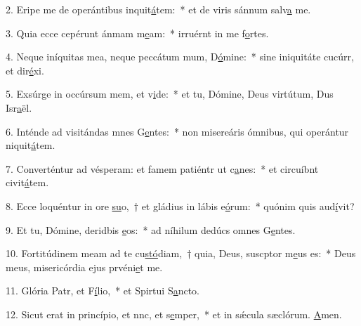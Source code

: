 2. Eripe me de operántibus inquit\uline{á}tem:~* et de viris sánnum salv\uline{a} me.\par 
3. Quia ecce cepérunt ánmam m\uline{e}am:~* irruérnt in me f\uline{o}rtes.\par 
4. Neque iníquitas mea, neque peccátum mum, D\uline{ó}mine:~* sine iniquitáte cucúrr, et dir\uline{é}xi.\par 
5. Exsúrge in occúrsum mem, et v\uline{i}de:~* et tu, Dómine, Deus virtútum, Dus Isr\uline{a}ël.\par 
6. Inténde ad visitándas mnes G\uline{e}ntes:~* non misereáris ómnibus, qui operántur niquit\uline{á}tem.\par 
7. Converténtur ad vésperam: et famem patiéntr ut c\uline{a}nes:~* et circuíbnt civit\uline{á}tem.\par 
8. Ecce loquéntur in ore \uline{su}o,~† et gládius in lábis e\uline{ó}rum:~* quónim quis aud\uline{í}vit?\par 
9. Et tu, Dómine, deridbis \uline{e}os:~* ad níhilum dedúcs omnes G\uline{e}ntes.\par 
10. Fortitúdinem meam ad te cu\uline{stó}diam,~† quia, Deus, suscptor m\uline{e}us es:~* Deus meus, misericórdia ejus prvéni\uline{e}t me.\par 
11. Glória Patr, et F\uline{í}lio,~* et Spirtui S\uline{a}ncto.\par 
12. Sicut erat in princípio, et nnc, et s\uline{e}mper,~* et in sǽcula sæclórum. \uline{A}men.\par 
